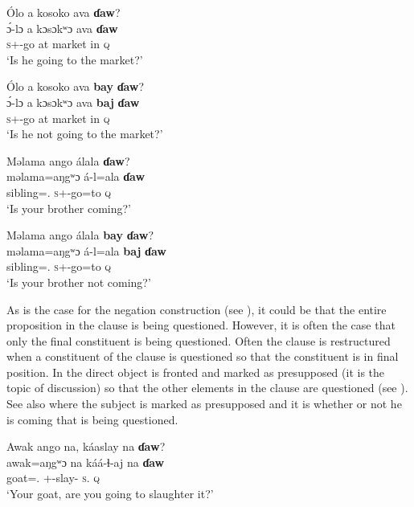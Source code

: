 \ea \label{ex:10:86}
Ólo  a  kosoko  ava  \textbf{ɗaw}?\\
\gll  \'{ɔ}-lɔ    a  kɔsɔkʷɔ  ava  \textbf{ɗaw}\\
      \textsc{s}+{\IFV}-go  at  market  in  {\textsc{q}}\\
\glt  ‘Is he going to the market?’
\z

\ea \label{ex:10:87}
Ólo  a  kosoko  ava  \textbf{bay}  \textbf{ɗaw}?\\
\gll  \'{ɔ}-lɔ    a  kɔsɔkʷɔ  ava  \textbf{baj}  \textbf{ɗaw}\\
      \textsc{s}+{\IFV}-go  at  market  in  {\NEG}  {\textsc{q}}\\
\glt  ‘Is he not going to the market?’
\z

\ea \label{ex:10:88}
Məlama  ango  álala  \textbf{ɗaw}?\\
\gll  məlama=aŋgʷɔ     á-l=ala     \textbf{ɗaw}\\
      sibling={\twoS}.{\POSS}  \textsc{s}+{\IFV}-go=to  {\textsc{q}}\\
\glt  ‘Is your brother coming?’
\z

\largerpage
\ea \label{ex:10:89}
Məlama  ango  álala  \textbf{bay}  \textbf{ɗaw}?\\
\gll  məlama=aŋgʷɔ     á-l=ala     \textbf{baj}  \textbf{ɗaw}\\
      sibling={\twoS}.{\POSS}  \textsc{s}+{\IFV}-go=to  {\NEG}  {\textsc{q}}\\
\glt  ‘Is your brother not coming?’
\z  

As is the case for the negation construction (see ), it could be that the entire proposition in the clause is being questioned. However, it is often the case that only the final constituent is being questioned. Often the clause is restructured when a constituent of the clause is questioned so that the constituent is in final position. In  the direct object is fronted and marked as presupposed (it is the topic of discussion) so that the other elements in the clause are questioned (see ). See also  where the subject is marked as presupposed and it is whether or not he is coming that is being questioned.

\ea \label{ex:10:90}
Awak  ango  na,  káaslay  na  \textbf{ɗaw}?\\
\gll  awak=aŋgʷɔ    na  káá-ɬ{}-aj    na  \textbf{ɗaw}\\
      goat={\twoS}.{\POSS}  {\PSP}  {\twoS}+{\POT}-slay{}-{\CL}  \textsc{s}.{\DO}  {\textsc{q}}\\
\glt  ‘Your goat, are you going to slaughter it?’
\z 

